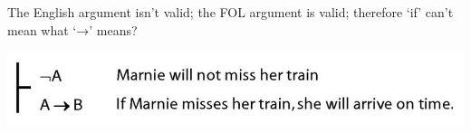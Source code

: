 \documentclass[12pt]{extarticle}
\begin{document}
\begin{multicols*}{3}
\begin{minipage}{\columnwidth}
 
The English argument isn't valid; the FOL argument is valid; therefore `if' can't mean what `→' means?
 
\begin{center}
\includegraphics[scale=0.3]{img/if_aint_arrow.png}
\end{center}
\end{minipage}
 


\end{multicols*}
\end{document}
